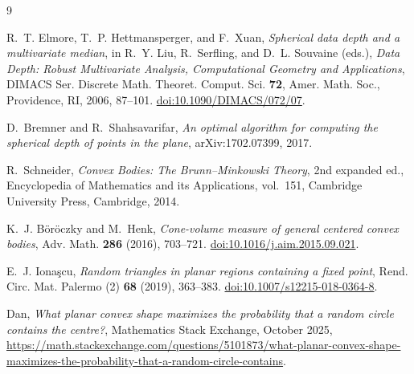 \documentclass[11pt]{article}
\theoremstyle{definition}
\theoremstyle{remark}
\begin{document}
\begin{thebibliography}{9}
\raggedright

R.~T. Elmore, T.~P. Hettmansperger, and F.~Xuan,
\emph{Spherical data depth and a multivariate median},
in R.~Y. Liu, R.~Serfling, and D.~L. Souvaine (eds.),
\emph{Data Depth: Robust Multivariate Analysis, Computational Geometry and Applications},
DIMACS Ser. Discrete Math. Theoret. Comput. Sci. \textbf{72},
Amer. Math. Soc., Providence, RI, 2006, 87--101.
\href{https://doi.org/10.1090/DIMACS/072/07}{doi:10.1090/DIMACS/072/07}.

D.~Bremner and R.~Shahsavarifar,
\emph{An optimal algorithm for computing the spherical depth of points in the plane},
arXiv:1702.07399, 2017.

R.~Schneider,
\emph{Convex Bodies: The Brunn--Minkowski Theory},
2nd expanded ed., Encyclopedia of Mathematics and its Applications, vol.~151,
Cambridge University Press, Cambridge, 2014.

K.~J. B\"or\"oczky and M.~Henk,
\emph{Cone-volume measure of general centered convex bodies},
Adv. Math. \textbf{286} (2016), 703--721.
\href{https://doi.org/10.1016/j.aim.2015.09.021}{doi:10.1016/j.aim.2015.09.021}.

E.~J. Iona\c{s}cu,
\emph{Random triangles in planar regions containing a fixed point},
Rend. Circ. Mat. Palermo (2) \textbf{68} (2019), 363--383.
\href{https://doi.org/10.1007/s12215-018-0364-8}{doi:10.1007/s12215-018-0364-8}.

Dan,
\emph{What planar convex shape maximizes the probability that a random circle contains the centre?},
Mathematics Stack Exchange, October 2025,
\url{https://math.stackexchange.com/questions/5101873/what-planar-convex-shape-maximizes-the-probability-that-a-random-circle-contains}.

\end{thebibliography}
\end{document}
